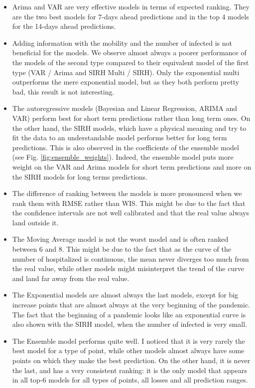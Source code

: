 \begin{itemize}
    \item Arima and VAR are very effective models in terms of expected ranking. They are the two best models for 7-days ahead predictions and in the top 4 models for the 14-days ahead predictions. 
    \item Adding information with the mobility and the number of infected is not beneficial for the models. We observe almost always a poorer performance of the models of the second type compared to their equivalent model of the first type (VAR / Arima and SIRH Multi / SIRH). Only the exponential multi outperforms the mere exponential model, but as they both perform pretty bad, this result is not interesting. 
    \item The autoregressive models (Bayesian and Linear Regression, ARIMA and VAR) perform best for short term predictions rather than long term ones. On the other hand, the SIRH models, which have a physical meaning and try to fit the data to an understandable model performs better for long term predictions. This is also observed in the coefficients of the ensemble model (see Fig. \ref{fig:ensemble_weights}). Indeed, the ensemble model puts more weight on the VAR and Arima models for short term predictions and more on the SIRH models for long terms predictions.  
    \item The difference of ranking between the models is more pronounced when we rank them with RMSE rather than WIS. This might be due to the fact that the confidence intervals are not well calibrated and that the real value always land outside it. 
    \item The Moving Average model is not the worst model and is often ranked between 6 and 8. This might be due to the fact that as the curve of the number of hospitalized is continuous, the mean never diverges too much from the real value, while other models might misinterpret the trend of the curve and land far away from the real value. 
    \item The Exponential models are almost always the last models, except for big increase points that are almost always at the very beginning of the pandemic. The fact that the beginning of a pandemic looks like an exponential curve is also shown with the SIRH model, when the number of infected is very small. 
    \item The Ensemble model performs quite well. I noticed that it is very rarely the best model for a type of point, while other models almost always have some points on which they make the best prediction. On the other hand, it is never the last, and has a very consistent ranking: it is the only model that appears in all top-6 models for all types of points, all losses and all prediction ranges.
\end{itemize}



